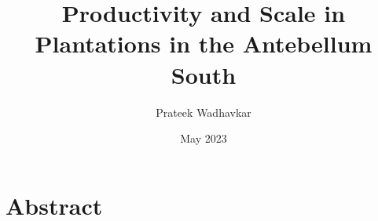 \documentclass{report}
\title{Productivity and Scale in Plantations in the Antebellum South}
\author{Prateek Wadhavkar}
\date{May 2023}
\begin{document}
\maketitle

\chapter*{Abstract}
\end{document}
